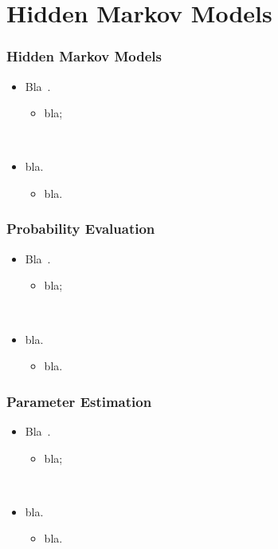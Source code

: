 \documentclass{beamer}
\begin{document}
\section{Hidden Markov Models}
\begin{frame}
  \frametitle{Hidden Markov Models}

  \begin{itemize}
    \item Bla~\cite{rabiner_fundamentals_1993}.
      \begin{itemize}
        \item bla; 
      \end{itemize}
      ~

    \item bla.
      \begin{itemize}
        \item bla.
      \end{itemize}
  \end{itemize}
\end{frame}

\begin{frame}
  \frametitle{Probability Evaluation}

  \begin{itemize}
    \item Bla~\cite{rabiner_fundamentals_1993}.
      \begin{itemize}
        \item bla; 
      \end{itemize}
      ~

    \item bla.
      \begin{itemize}
        \item bla.
      \end{itemize}
  \end{itemize}
\end{frame}

\begin{frame}
  \frametitle{Parameter Estimation}

  \begin{itemize}
    \item Bla~\cite{rabiner_fundamentals_1993}.
      \begin{itemize}
        \item bla; 
      \end{itemize}
      ~

    \item bla.
      \begin{itemize}
        \item bla.
      \end{itemize}
  \end{itemize}
\end{frame}
\end{document}
